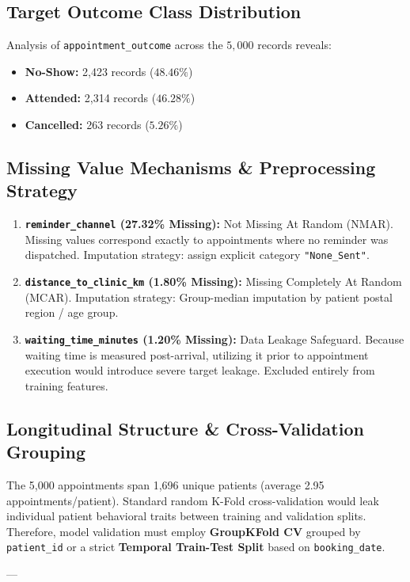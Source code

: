 \documentclass[11pt,a4paper]{article}
\begin{document}
\subsection{Target Outcome Class Distribution}
Analysis of \texttt{appointment\_outcome} across the $5,000$ records reveals:
\begin{itemize}
    \item \textbf{No-Show:} 2,423 records ($48.46\%$)
    \item \textbf{Attended:} 2,314 records ($46.28\%$)
    \item \textbf{Cancelled:} 263 records ($5.26\%$)
\end{itemize}

\subsection{Missing Value Mechanisms \& Preprocessing Strategy}
\begin{enumerate}
    \item \textbf{\texttt{reminder\_channel} (27.32\% Missing):} Not Missing At Random (NMAR). Missing values correspond exactly to appointments where no reminder was dispatched. Imputation strategy: assign explicit category \texttt{"None\_Sent"}.
    \item \textbf{\texttt{distance\_to\_clinic\_km} (1.80\% Missing):} Missing Completely At Random (MCAR). Imputation strategy: Group-median imputation by patient postal region / age group.
    \item \textbf{\texttt{waiting\_time\_minutes} (1.20\% Missing):} Data Leakage Safeguard. Because waiting time is measured post-arrival, utilizing it prior to appointment execution would introduce severe target leakage. Excluded entirely from training features.
\end{enumerate}

\subsection{Longitudinal Structure \& Cross-Validation Grouping}
The 5,000 appointments span 1,696 unique patients (average 2.95 appointments/patient). Standard random K-Fold cross-validation would leak individual patient behavioral traits between training and validation splits. Therefore, model validation must employ \textbf{GroupKFold CV} grouped by \texttt{patient\_id} or a strict \textbf{Temporal Train-Test Split} based on \texttt{booking\_date}.

---
\end{document}
